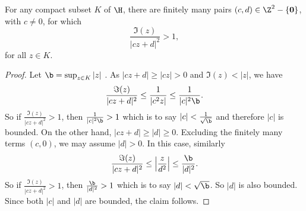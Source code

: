     \begin{lemma}\label{lem:finitely_many_pairs_with_size_larger_than_one}
      For any compact subset $K$ of $\H$, there are finitely many pairs $(c,d) \in \Z^{2}-\{\mathbf{0}\}$, with $c \neq 0$, for which
      \[
        \frac{\Im(z)}{|cz+d|^{2}} > 1,
      \]
      for all $z \in K$.
      \end{lemma}
      \begin{proof}
      Let $\b = \sup_{z \in K}|z|$ . As $|cz+d| \ge |cz| > 0$ and $\Im(z) < |z|$, we have
      \[
        \frac{\Im(z)}{|cz+d|^{2}} \le \frac{1}{|c^{2}z|} \le \frac{1}{|c|^{2}\b}.
      \]
      So if $\frac{\Im(z)}{|cz+d|^{2}} > 1$, then $\frac{1}{|c|^{2}\b} > 1$ which is to say $|c| < \frac{1}{\sqrt{\b}}$ and therefore $|c|$ is bounded. On the other hand, $|cz+d| \ge |d| \ge 0$. Excluding the finitely many terms $(c,0)$, we may assume $|d| > 0$. In this case, similarly  
      \[
        \frac{\Im(z)}{|cz+d|^{2}} \le \left|\frac{z}{d^{2}}\right| \le \frac{\b}{|d|^{2}}.
      \]
      So if $\frac{\Im(z)}{|cz+d|^{2}} > 1$, then $\frac{\b}{|d|^{2}}> 1$ which is to say $|d| < \sqrt{\b}$. So $|d|$ is also bounded. Since both $|c|$ and $|d|$ are bounded, the claim follows.
    \end{proof}

